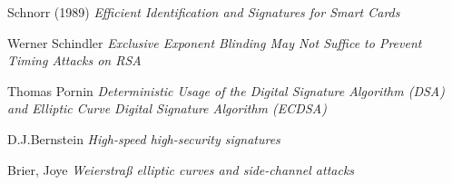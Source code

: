 \documentclass[a4paper,11pt]{article}
\begin{document}
\begin{thebibliography}{1}
 Schnorr (1989) {\em Efficient Identification and Signatures for Smart Cards}

 Werner Schindler {\em Exclusive Exponent Blinding May Not Suffice to Prevent Timing Attacks on RSA}

 Thomas Pornin {\em Deterministic Usage of the Digital Signature Algorithm (DSA) and Elliptic Curve Digital Signature Algorithm (ECDSA)}

 D.J.Bernstein {\em High-speed high-security signatures}

 Brier, Joye {\em Weierstraß elliptic curves and side-channel attacks}

\end{thebibliography}


\end{document}
